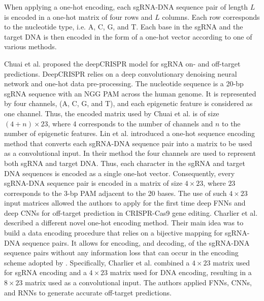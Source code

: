 \documentclass[unnumsec,webpdf,contemporary,large]{oup-authoring-template}
\theoremstyle{thmstyleone}%
\theoremstyle{thmstyletwo}%
\theoremstyle{thmstylethree}%
\begin{document}
When applying a one-hot encoding, each sgRNA-DNA sequence pair of length $L$ is encoded in a one-hot matrix of four rows and $L$ columns. Each row corresponds to the nucleotide type, i.e. A, C, G, and T. Each base in the sgRNA and the target DNA is then encoded in the form of a one-hot vector according to one of various methods. 

Chuai et al. \cite{chuai2018deepcrispr} proposed the deepCRISPR model for sgRNA on- and off-target predictions. DeepCRISPR relies on a deep convolutionary denoising neural network and one-hot data pre-processing. The nucleotide sequence is a 20-bp sgRNA sequence with an NGG PAM across the human genome. It is represented by four channels, (A, C, G, and T), and each epigenetic feature is considered as one channel. Thus, the encoded matrix used by Chuai et al. is of size $(4 + n) \times 23 $, where 4 corresponds to the number of channels and $n$ to the number of epigenetic features.
Lin et al. \cite{lin2018off} introduced a one-hot sequence encoding method that converts each sgRNA-DNA sequence pair into a matrix to be used as a convolutional input. In their method the four channels are used to represent both sgRNA and target DNA. Thus, each character in the sgRNA and target DNA sequences is encoded as a single one-hot vector. Consequently, every sgRNA-DNA sequence pair is encoded in a matrix of size $4 \times 23$, where $23$ corresponds to the 3-bp PAM adjacent to the 20 bases. The use of such $4 \times 23$ input matrices allowed the authors to apply for the first time deep FNNs and deep CNNs for off-target prediction in CRISPR-Cas9 gene editing.
Charlier et al. \cite{charlier2021accurate} described a different novel one-hot encoding method. Their main idea was to build a data encoding procedure that relies on a bijective mapping for sgRNA-DNA sequence pairs. It allows for encoding, and decoding, of the sgRNA-DNA sequence pairs without any information loss that can occur in the encoding scheme adopted by \cite{lin2018off}. Specifically, Charlier et al. combined a $4 \times 23$ matrix used for sgRNA encoding and a $4 \times 23$ matrix used for DNA encoding, resulting in a $8 \times 23 $ matrix used as a convolutional input. The authors applied FNNs, CNNs, and RNNs to generate accurate off-target predictions. 
\end{document}
